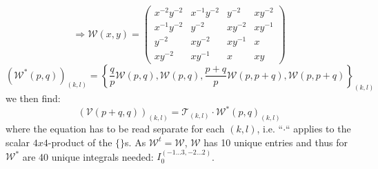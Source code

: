 \begin{equation}
\Rightarrow \mathcal W(x,y) = \!\left(\!\!
\begin{array}{cccc}
x^{-2}y^{-2} & x^{-1}y^{-2} & y^{-2} & xy^{-2}\\
x^{-1}y^{-2} & y^{-2} & xy^{-2} & xy^{-1} \\
y^{-2} & xy^{-2} & xy^{-1} & x\\
xy^{-2} & xy^{-1} & x & xy
\end{array}\!\!
\right)
\end{equation}
\begin{equation}
\left(\mathcal{W}^*(p,q)\right)_{(k,l)} = \left\{\frac q p\mathcal W(p,q),\mathcal W(p,q),\frac {p+q} p\mathcal W(p,p+q),\mathcal{W}(p,p+q)\right\}_{(k,l)}
\end{equation}
we then find:
\begin{equation}
\left(\mathcal V(p+q,q)\right)_{(k,l)} = \mathcal T_{(k,l)}\cdot \mathcal W^*(p,q)_{(k,l)}
\end{equation}
where the equation has to be read separate for each $(k,l)$, i.e. ``$\cdot$`` applies to the scalar $4x4$-product of the $\{\}$s. As $\mathcal W^t = \mathcal W$, $\mathcal W$ has 10 unique entries and thus for $\mathcal W^*$ are 40 unique integrals needed: $I_0^{(-1\ldots 3,-2\ldots 2)}$.

